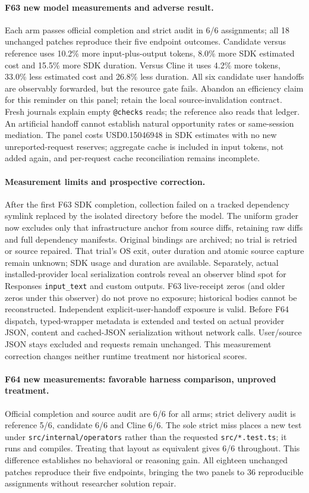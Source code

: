 \documentclass[11pt,a4paper]{article}
\begin{document}
\paragraph{F63 new model measurements and adverse result.}
Each arm passes official completion and strict audit in 6/6 assignments; all
18 unchanged patches reproduce their five endpoint outcomes. Candidate versus
reference uses 10.2\% more input-plus-output tokens, 8.0\% more SDK estimated cost
and 15.5\% more SDK duration. Versus Cline it uses 4.2\% more tokens, 33.0\% less
estimated cost and 26.8\% less duration. All six candidate user handoffs are
observably forwarded, but the resource gate fails. Abandon an efficiency claim
for this reminder on this panel; retain the local source-invalidation contract.
Fresh journals explain empty \texttt{@checks} reads; the reference also reads
that ledger. An artificial handoff cannot establish natural opportunity rates
or same-session mediation. The panel costs USD0.15046948 in SDK estimates with
no new unreported-request reserves; aggregate cache is included in input tokens,
not added again, and per-request cache reconciliation remains incomplete.

\paragraph{Measurement limits and prospective correction.}
After the first F63 SDK completion, collection failed on a tracked dependency
symlink replaced by the isolated directory before the model. The uniform grader
now excludes only that infrastructure anchor from source diffs, retaining raw
diffs and full dependency manifests. Original bindings are archived; no trial
is retried or source repaired. That trial's OS exit, outer duration and atomic
source capture remain unknown; SDK usage and duration are available. Separately,
actual installed-provider local serialization controls reveal an observer blind
spot for Responses \texttt{input\_text} and custom outputs. F63 live-receipt zeros
(and older zeros under this observer) do not prove no exposure; historical
bodies cannot be reconstructed. Independent explicit-user-handoff exposure is
valid. Before F64 dispatch, typed-wrapper metadata is extended and tested on
actual provider JSON, content and cached-JSON serialization without network
calls. User/source JSON stays excluded and requests remain unchanged. This
measurement correction changes neither runtime treatment nor historical scores.

\paragraph{F64 new measurements: favorable harness comparison, unproved treatment.}
Official completion and source audit are 6/6 for all arms; strict delivery audit
is reference 5/6, candidate 6/6 and Cline 6/6. The sole strict miss places a new
test under \texttt{src/internal/operators} rather than the requested
\texttt{src/*.test.ts}; it runs and compiles. Treating that layout as equivalent
gives 6/6 throughout. This difference establishes no behavioral or reasoning gain.
All eighteen unchanged patches reproduce their five endpoints, bringing the two
panels to 36 reproducible assignments without researcher solution repair.
\end{document}
